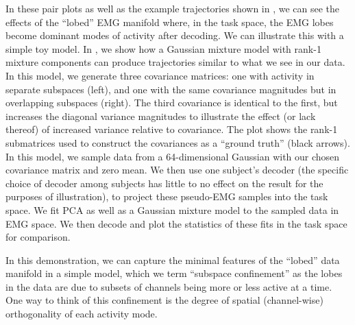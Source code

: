 \documentclass[../main.tex]{subfiles}
\begin{document}
In these pair plots as well as the example trajectories shown in , we can see the effects of the ``lobed'' EMG manifold where, in the task space, the EMG lobes become dominant modes of activity after decoding. We can illustrate this with a simple toy model. In , we show how a Gaussian mixture model with rank-1 mixture components can produce trajectories similar to what we see in our data. In this model, we generate three covariance matrices: one with activity in separate subspaces (left), and one with the same covariance magnitudes but in overlapping subspaces (right). The third covariance is identical to the first, but increases the diagonal variance magnitudes to illustrate the effect (or lack thereof) of increased variance relative to covariance. The plot shows the rank-1 submatrices used to construct the covariances as a ``ground truth'' (black arrows). In this model, we sample data from a 64-dimensional Gaussian with our chosen covariance matrix and zero mean. We then use one subject's decoder (the specific choice of decoder among subjects has little to no effect on the result for the purposes of illustration), to project these pseudo-EMG samples into the task space. We fit PCA as well as a Gaussian mixture model to the sampled data in EMG space. We then decode and plot the statistics of these fits in the task space for comparison.

In this demonstration, we can capture the minimal features of the ``lobed'' data manifold in a simple model, which we term ``subspace confinement'' as the lobes in the data are due to subsets of channels being more or less active at a time. One way to think of this confinement is the degree of spatial (channel-wise) orthogonality of each activity mode.
\end{document}
